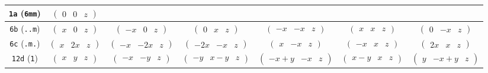 \documentclass[fleqn,9pt,landscape]{jsarticle}
\begin{document}
\begin{center}
\begin{longtable}{ccccccc}
{\tt 1a} ({\tt 6mm}) & $ \begin{pmatrix} 0 & 0 & z \end{pmatrix} $ & $  $ & $  $ & $  $ & $  $ & $  $ \\ \hline
{\tt 6b} ({\tt ..m}) & $ \begin{pmatrix} x & 0 & z \end{pmatrix} $ & $ \begin{pmatrix} - x & 0 & z \end{pmatrix} $ & $ \begin{pmatrix} 0 & x & z \end{pmatrix} $ & $ \begin{pmatrix} - x & - x & z \end{pmatrix} $ & $ \begin{pmatrix} x & x & z \end{pmatrix} $ & $ \begin{pmatrix} 0 & - x & z \end{pmatrix} $ \\ \hline
{\tt 6c} ({\tt .m.}) & $ \begin{pmatrix} x & 2 x & z \end{pmatrix} $ & $ \begin{pmatrix} - x & - 2 x & z \end{pmatrix} $ & $ \begin{pmatrix} - 2 x & - x & z \end{pmatrix} $ & $ \begin{pmatrix} x & - x & z \end{pmatrix} $ & $ \begin{pmatrix} - x & x & z \end{pmatrix} $ & $ \begin{pmatrix} 2 x & x & z \end{pmatrix} $ \\ \hline
{\tt 12d} ({\tt 1}) & $ \begin{pmatrix} x & y & z \end{pmatrix} $ & $ \begin{pmatrix} - x & - y & z \end{pmatrix} $ & $ \begin{pmatrix} - y & x - y & z \end{pmatrix} $ & $ \begin{pmatrix} - x + y & - x & z \end{pmatrix} $ & $ \begin{pmatrix} x - y & x & z \end{pmatrix} $ & $ \begin{pmatrix} y & - x + y & z \end{pmatrix} $ \\

\end{longtable}
\end{center}
\end{document}
